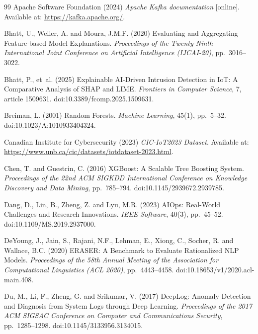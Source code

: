 \documentclass[12pt,a4paper]{report}
\begin{document}
\begin{thebibliography}{99}
Apache Software Foundation (2024) \textit{Apache Kafka documentation} [online]. Available at: \url{https://kafka.apache.org/}.

Bhatt, U., Weller, A. and Moura, J.M.F. (2020) Evaluating and Aggregating Feature-based Model Explanations. \textit{Proceedings of the Twenty-Ninth International Joint Conference on Artificial Intelligence (IJCAI-20)}, pp.~3016--3022.

Bhatt, P., et~al. (2025) Explainable AI-Driven Intrusion Detection in IoT: A Comparative Analysis of SHAP and LIME. \textit{Frontiers in Computer Science}, 7, article 1509631. doi:10.3389/fcomp.2025.1509631.

Breiman, L. (2001) Random Forests. \textit{Machine Learning}, 45(1), pp.~5--32. doi:10.1023/A:1010933404324.

Canadian Institute for Cybersecurity (2023) \textit{CIC-IoT2023 Dataset}. Available at: \url{https://www.unb.ca/cic/datasets/iotdataset-2023.html}.

Chen, T. and Guestrin, C. (2016) XGBoost: A Scalable Tree Boosting System. \textit{Proceedings of the 22nd ACM SIGKDD International Conference on Knowledge Discovery and Data Mining}, pp.~785--794. doi:10.1145/2939672.2939785.

Dang, D., Lin, B., Zheng, Z. and Lyu, M.R. (2023) AIOps: Real-World Challenges and Research Innovations. \textit{IEEE Software}, 40(3), pp.~45--52. doi:10.1109/MS.2019.2937000.


DeYoung, J., Jain, S., Rajani, N.F., Lehman, E., Xiong, C., Socher, R. and Wallace, B.C. (2020) ERASER: A Benchmark to Evaluate Rationalized NLP Models. \textit{Proceedings of the 58th Annual Meeting of the Association for Computational Linguistics (ACL 2020)}, pp.~4443--4458. doi:10.18653/v1/2020.acl-main.408.

Du, M., Li, F., Zheng, G. and Srikumar, V. (2017) DeepLog: Anomaly Detection and Diagnosis from System Logs through Deep Learning. \textit{Proceedings of the 2017 ACM SIGSAC Conference on Computer and Communications Security}, pp.~1285--1298. doi:10.1145/3133956.3134015.


\end{thebibliography}
\end{document}
